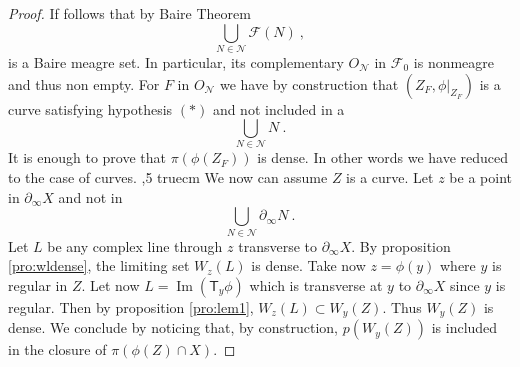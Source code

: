 \documentclass[10pt,a4paper]{amsart}
\newcommand{\T}{\ms T}
\newcommand{\bX}{\partial_\infty X}
\newcommand{\im}{\operatorname{Im}}
\newcommand{\mc}{\mathcal}
\newcommand{\ms}{\mathsf}
\begin{document}
\begin{proof}
If follows that by Baire Theorem
$$
\bigcup_{N\in\mc N}{\mc F}(N)\ ,
$$
 is a Baire meagre set. In particular, its complementary $O_{\mc N}$ in $\mc F_0$ is nonmeagre and thus non empty. For $F$ in  $O_{\mc N}$ we have by construction that $(Z_F,\phi\vert_{Z_F})$ is a curve satisfying hypothesis $(*)$ and not included in a 
 $$
\bigcup_{N\in\mc N} N\ .
 $$
It is enough to prove that $\pi(\phi(Z_F))$ is dense. In other words we have reduced to the case of curves. 
,5 truecm
 We now can assume $Z$ is a curve. Let $z$ be a point in $\bX$ and not in 
$$
\bigcup_{N\in\mc N}\partial_\infty N\ .
$$ 
Let $L$ be any complex line through $z$ transverse to $\bX$. By proposition \ref{pro:wldense}, the limiting set $W_z(L)$ is dense. Take now $z=\phi(y)$ where $y$ is regular in $Z$. Let now $L=\im(\T_y\phi)$ which is transverse at $y$ to $\bX$ since $y$ is regular. Then by proposition \ref{pro:lem1},
$W_z(L)\subset W_y(Z)$. Thus $W_y(Z)$ is dense. We conclude  by noticing that, by construction,  $p(W_y(Z))$ is included in the closure of  $\pi(\phi(Z)\cap X)$.
	\end{proof}
\end{document}
